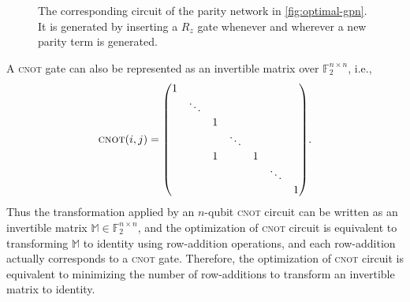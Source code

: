 \documentclass[a4paper,cleveref, autoref, 11pt, fleqn, thm-restate]{article}
\theoremstyle{plain}
\begin{document}
\begin{figure}[ht!]
  \centering
  \caption{The corresponding circuit of the parity network in \cref{fig:optimal-gpn}. It is generated by inserting a $R_z$ gate whenever and wherever a new parity term is generated.}
  \label{fig:pn-example2}

\end{figure}

A \textsc{cnot} gate can also be represented as an invertible matrix over $\mathbb{F}_2^{n \times n}$, i.e.,
\[
  {\displaystyle \textsc{cnot}(i,j)={\begin{pmatrix}1&&&&&&\\&\ddots &&&&&\\&&1&&&&\\&&&\ddots &&&\\&&1&&1&&\\&&&&&\ddots &\\&&&&&&1\end{pmatrix}}}.
\]%
Thus the transformation applied by an $n$-qubit \textsc{cnot} circuit can be written as an invertible matrix $\mathbb{M} \in \mathbb{F}_2^{n \times n}$, and the optimization of \textsc{cnot} circuit is equivalent to transforming $\mathbb{M}$ to identity using {row-addition operations, and each row-addition actually corresponds to a \textsc{cnot} gate}. %
Therefore, the optimization of \textsc{cnot} circuit is equivalent to minimizing the number of row-additions to transform an invertible matrix to identity.
\end{document}
